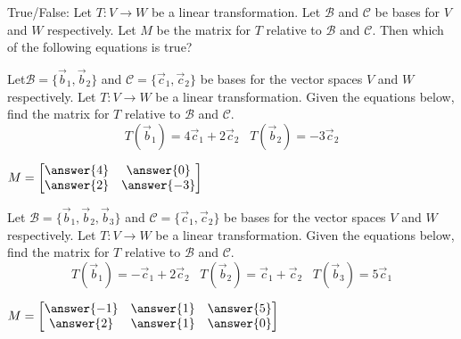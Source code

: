 \documentclass{ximera}
\begin{document}
  	  		      \begin{question} True/False: Let $T:V\to W$ be a linear transformation. Let $\mathcal{B}$ and $\mathcal{C}$ be bases for $V$ and $W$ respectively. Let $M$ be the matrix for $T$ relative to $\mathcal{B}$ and $\mathcal{C}$. Then which of the following equations is true? 
  	  		      	
  	  		      	\begin{multipleChoice}
  	  		      	\end{multipleChoice}
  	  		      	
  	  		      \end{question}	
  	  		 \begin{question} Let$\mathcal{B} = \{\vec{b}_1, \vec{b}_2\}$ and $\mathcal{C} = \{\vec{c}_1, \vec{c}_2\}$ be bases for the vector spaces $V$ and $W$ respectively. Let  $T:V\to W$ be a linear transformation. Given the equations below, find the matrix for $T$ relative to $\mathcal{B}$ and $\mathcal{C}$.
  	  		 	$$ T(\vec{b}_1) = 4\vec{c}_1 +2\vec{c}_2 \hspace{10pt} T(\vec{b}_2) = -3\vec{c}_2$$
  	  		 	
  	  		 	$M = \begin{bmatrix} \answer{4} & \answer{0}\\ \answer{2} &\answer{-3}\end{bmatrix}$
  	  		 	
  	  		 	\end{question}
  	  		      	 \begin{question} Let $\mathcal{B} = \{\vec{b}_1, \vec{b}_2,\vec{b}_3\}$ and $\mathcal{C} = \{\vec{c}_1, \vec{c}_2\}$ be bases for the vector spaces $V$ and $W$ respectively. Let  $T:V\to W$ be a linear transformation. Given the equations below, find the matrix for $T$ relative to $\mathcal{B}$ and $\mathcal{C}$.
  	  		      	 	$$ T(\vec{b}_1) = -\vec{c}_1 +2\vec{c}_2 \hspace{10pt} T(\vec{b}_2) = \vec{c}_1+\vec{c}_2 \hspace{10pt} T(\vec{b}_3) = 5\vec{c}_1$$
  	  		      	 	
  	  		      	 	$M = \begin{bmatrix} \answer{-1} & \answer{1}& \answer{5}\\ \answer{2} &\answer{1}&\answer{0} \end{bmatrix}$
  	  		      	 	
  	  		      	 \end{question}
\end{document}
